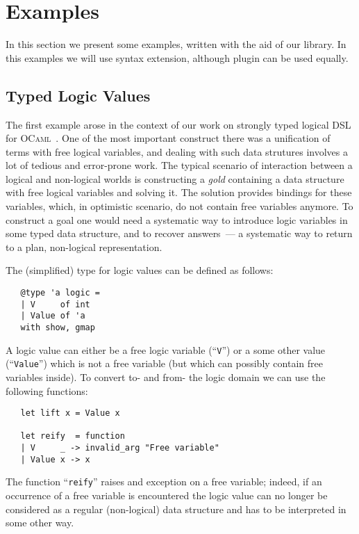 \section{Examples}

In this section we present some examples, written with the aid of our library. In this examples we will use  syntax extension,
although  plugin can be used equally.

\subsection{Typed Logic Values}

The first example arose in the context of our work on strongly typed logical DSL for \textsc{OCaml}~\cite{OCanren}. One of the
most important construct there was a unification of terms with free logical variables, and dealing with such data strutures
involves a lot of tedious and error-prone work. The typical scenario of interaction between a logical and non-logical worlds
is constructing a \emph{gold} containing a data structure with free logical variables and solving it. The solution
provides bindings for these variables, which, in optimistic scenario, do not contain free variables anymore. To construct
a goal one would need a systematic way to introduce logic variables in some typed data structure, and to recover answers~---
a systematic way to return to a plan, non-logical representation.

The (simplified) type for logic values can be defined as follows:

\begin{lstlisting}
   @type 'a logic =
   | V     of int
   | Value of 'a
   with show, gmap
\end{lstlisting}

A logic value can either be a free logic variable (``\lstinline{V}'') or a some other value (``\lstinline{Value}'') which is not
a free variable (but which can possibly contain free variables inside). To convert to- and from- the logic domain we can use the following
functions:

\begin{lstlisting}
   let lift x = Value x
  
   let reify  = function
   | V     _ -> invalid_arg "Free variable"
   | Value x -> x
\end{lstlisting}

The function ``\lstinline{reify}'' raises and exception on a free variable; indeed, if an occurrence of a free variable
is encountered the logic value can no longer be considered as a regular (non-logical) data structure and has to be interpreted
in some other way.

